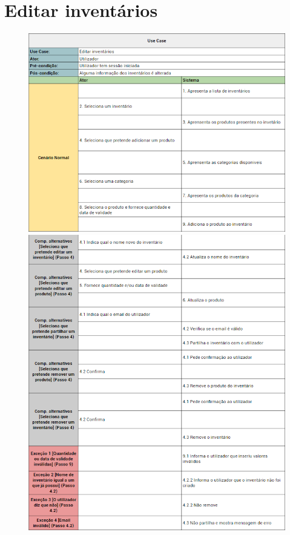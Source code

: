 \documentclass[a4paper]{report}
\begin{document}
    \section{Editar inventários}
        \begin{figure}[H]
        \centering
            \includegraphics[width=\textwidth]{images/usecases/editar_iventarios_1.png}
            \includegraphics[width=\textwidth]{images/usecases/editar_iventarios_2.png}
        \end{figure}
\end{document}
